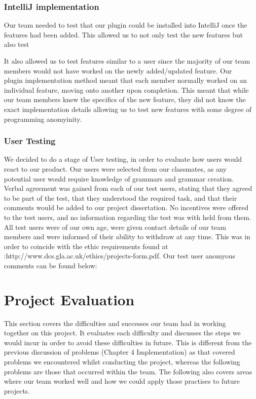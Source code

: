 \subsubsection{IntelliJ implementation}
Our team needed to test that our plugin could be installed into IntelliJ once the features had been added. This allowed us to not only test the new features but also test


It also allowed us to test features similar to a user since the majority of our team members would not have worked on the newly added/updated feature. Our plugin implementation method meant that each member normally worked on an individual feature, moving onto another upon completion. This meant that while our team members knew the specifics of the new feature, they did not know the exact implementation details allowing us to test new features with some degree of programming anomyinity. 
\\
\subsubsection{User Testing}
We decided to do a stage of User testing, in order to evaluate how users would react to our product. Our users were selected from our classmates, as any potential user would require knowledge of grammars and grammar creation. Verbal agreement was gained from each of our test users, stating that they agreed to be part of the test, that they understood the required task, and that their comments would be added to our project dissertation. No incentives were offered to the test users, and no information regarding the test was with held from them.  All test users were of our own age, were given contact details of our team members and were informed of their ability to withdraw at any time. This was in order to coincide with the ethic requirements found at :http://www.dcs.gla.ac.uk/ethics/projects-form.pdf. Our test user anomyous comments can be found below:
\\
\section{Project Evaluation}
This section covers the difficulties and successes our team had in working together on this project. It evaluates each difficulty and discusses the steps we would incur in order to avoid these difficulties in future. This is different from the previous discussion of problems (Chapter 4 Implementation) as that covered problems we encountered whilst conducting the project, whereas the following problems are those that occurred within the team. The following also covers areas where our team worked well and how we could apply those practises to future projects.  \\
\\
